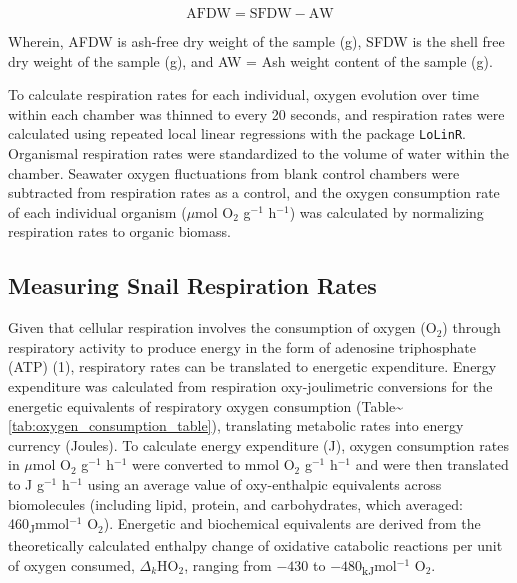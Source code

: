 \documentclass{CSUNthesis}
\begin{document}
\begin{equation}
\label{eq:afdw}
\mathrm{AFDW} = \mathrm{SFDW} - \mathrm{AW}
\end{equation}

Wherein, AFDW is ash-free dry weight of the sample (g), SFDW is the shell free dry weight of the sample (g), and AW = Ash weight content of the sample (g).

To calculate respiration rates for each individual, oxygen evolution over time within each chamber was thinned to every 20 seconds, and respiration rates were calculated using repeated local linear regressions with the package \texttt{LoLinR}. Organismal respiration rates were standardized to the volume of water within the chamber. Seawater oxygen fluctuations from blank control chambers were subtracted from respiration rates as a control, and the oxygen consumption rate of each individual organism (\(\mu\)mol O\(_2\) g\(^{-1}\) h\(^{-1}\)) was calculated by normalizing respiration rates to organic biomass.

\subsection*{Measuring Snail Respiration Rates}\label{measuring-snail-respiration-rates-1}

Given that cellular respiration involves the consumption of oxygen (O\(_2\)) through respiratory activity to produce energy in the form of adenosine triphosphate (ATP) (1), respiratory rates can be translated to energetic expenditure. Energy expenditure was calculated from respiration oxy-joulimetric conversions for the energetic equivalents of respiratory oxygen consumption (Table\textasciitilde{}\ref{tab:oxygen_consumption_table}), translating metabolic rates into energy currency (Joules).
To calculate energy expenditure (J), oxygen consumption rates in \(\mu\)mol O\(_2\) g\(^{-1}\) h\(^{-1}\) were converted to mmol O\(_2\) g\(^{-1}\) h\(^{-1}\) and were then translated to J g\(^{-1}\) h\(^{-1}\) using an average value of oxy-enthalpic equivalents across biomolecules (including lipid, protein, and carbohydrates, which averaged: 460\textsubscript{J}mmol\(^{-1}\) O\(_2\)). Energetic and biochemical equivalents are derived from the theoretically calculated enthalpy change of oxidative catabolic reactions per unit of oxygen consumed, \(\Delta_k\)HO\(_2\), ranging from \(-430\) to \(-480\)\textsubscript{kJ}mol\(^{-1}\) O\(_2\).
\end{document}
